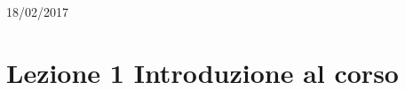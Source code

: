 \documentclass[a4paper,10pt] {article}
\begin{document}
\begin{titlepage}


{\large 18/02/2017}\\[3cm] %




 

\vfill %

\end{titlepage}
\newpage
{}

\section{Lezione 1 Introduzione al corso}
\end{document}
